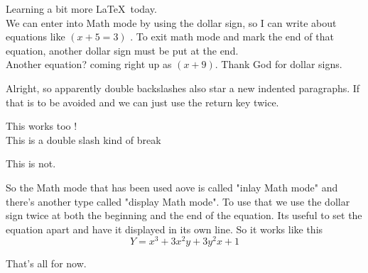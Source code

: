 \documentclass[11pt]{article}
\begin{document}
Learning a bit more \LaTeX\  today.\\

We can enter into Math mode by using the dollar sign, so I can write about equations like $(x+5=3)$ .  To exit math mode and mark the end of that equation, another dollar sign must be put at the end. \\

Another equation? coming right up as $(x+9)$. Thank God for dollar signs.

Alright, so apparently double backslashes also star a new indented paragraphs. If that is to be avoided and we can just use the return key twice.

This works too !\\
This is a double slash kind of break

This is not.

So the Math mode that has been used aove is called "inlay Math mode" and there's another type called "display Math mode". To use that we use the dollar sign twice at both the beginning and the end of the equation. Its useful to set the equation apart and have it displayed in its own line. So it works like this $$Y = x^3 + 3x^2y + 3y^2x +1$$

That's all for now.
\end{document}
